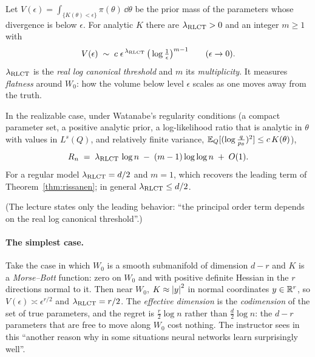 \begin{defn}\label{def:rlct}
Let $V(\epsilon)=\int_{\{K(\theta)<\epsilon\}}\pi(\theta)\,\dd\theta$ be the prior mass of the parameters whose divergence is below $\epsilon$. For analytic $K$ there are $\lambda_{\mathrm{RLCT}}>0$ and an integer $m\ge1$ with
\[
   V(\epsilon)\;\sim\;c\;\epsilon^{\,\lambda_{\mathrm{RLCT}}}\,\big(\log\tfrac1\epsilon\big)^{m-1}\qquad(\epsilon\to0).
\]
$\lambda_{\mathrm{RLCT}}$ is the \emph{real log canonical threshold} and $m$ its \emph{multiplicity}. It measures \emph{flatness} around $W_0$: how the volume below level $\epsilon$ scales as one moves away from the truth.
\end{defn}

\begin{thm}[Watanabe]\label{thm:watanabe}
In the realizable case, under Watanabe's regularity conditions (a compact parameter set, a positive analytic prior, a log-likelihood ratio that is analytic in $\theta$ with values in $L^s(Q)$, and relatively finite variance, $\mathbb{E}_Q[(\log\frac{q}{p_\theta})^2]\le c\,K(\theta)$),
\[
   R_n\;=\;\lambda_{\mathrm{RLCT}}\,\log n\;-\;(m-1)\log\log n\;+\;O(1).
\]
For a regular model $\lambda_{\mathrm{RLCT}}=d/2$ and $m=1$, which recovers the leading term of Theorem~\ref{thm:rissanen}; in general $\lambda_{\mathrm{RLCT}}\le d/2$.
\end{thm}
\noindent (The lecture states only the leading behavior: ``the principal order term depends on the real log canonical threshold''.)

\paragraph{The simplest case.}
Take the case in which $W_0$ is a smooth submanifold of dimension $d-r$ and $K$ is a \emph{Morse--Bott} function: zero on $W_0$ and with positive definite Hessian in the $r$ directions normal to it. Then near $W_0$, $K\approx\left\lvert y\right\rvert^2$ in normal coordinates $y\in\mathbb{R}^r$, so $V(\epsilon)\asymp\epsilon^{r/2}$ and $\lambda_{\mathrm{RLCT}}=r/2$. The \emph{effective dimension} is the \emph{codimension} of the set of true parameters, and the regret is
$\tfrac r2\log n$ rather than $\tfrac d2\log n$: the $d-r$ parameters that are free to move along $W_0$ cost nothing. The instructor sees in this ``another reason why in some situations neural networks learn surprisingly well''.

